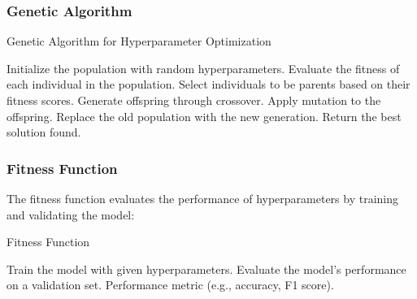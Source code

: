 \subsubsection{Genetic Algorithm}
\begin{algorithm}[H]
    \caption{Genetic Algorithm for Hyperparameter Optimization}
    \begin{algorithmic}[1]
        \STATE Initialize the population with random hyperparameters.
        \STATE Evaluate the fitness of each individual in the population.
        \STATE Select individuals to be parents based on their fitness scores.
        \STATE Generate offspring through crossover.
        \STATE Apply mutation to the offspring.
        \STATE Replace the old population with the new generation.
        \ENDFOR
        \STATE Return the best solution found.
    \end{algorithmic}
\end{algorithm}

\subsubsection{Fitness Function}
The fitness function evaluates the performance of hyperparameters by training
and validating the model:

\begin{algorithm}[H]
    \caption{Fitness Function}
    \begin{algorithmic}[1]
        \STATE Train the model with given hyperparameters.
        \STATE Evaluate the model's performance on a validation set.
        \RETURN Performance metric (e.g., accuracy, F1 score).
    \end{algorithmic}
\end{algorithm}

